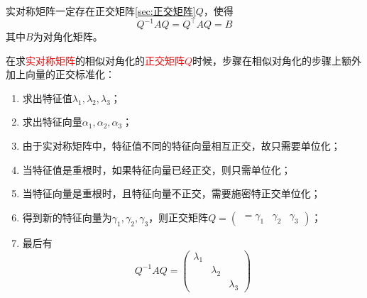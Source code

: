 \begin{theorem}
    实对称矩阵一定存在正交矩阵\ref{sec:正交矩阵}$Q$，使得
    \[ Q^{-1}AQ = Q^\intercal AQ = B \]
    其中$B$为对角化矩阵。
\end{theorem}
在求\textcolor{red}{实对称矩阵}的相似对角化的\textcolor{red}{正交矩阵$Q$}时候，步骤在相似对角化的步骤上额外加上向量的正交标准化：
\begin{enumerate}[(1)]
    \item 求出特征值$\lambda_1,\lambda_2,\lambda_3$；
    \item 求出特征向量$\alpha_1,\alpha_2,\alpha_3$；
    \item 由于实对称矩阵中，特征值不同的特征向量相互正交，故只需要单位化；
    \item 当特征值是重根时，如果特征向量已经正交，则只需单位化；
    \item 当特征向量是重根时，且特征向量不正交，需要施密特正交单位化；
    \item 得到新的特征向量为$\gamma_1,\gamma_2,\gamma_3$，则正交矩阵$Q=\begin{pmatrix}=\gamma_1 & \gamma_2 & \gamma_3\end{pmatrix}$；
    \item 最后有
          \[
              Q^{-1}AQ =
              \begin{pmatrix}
                  \lambda_1 &           &           \\
                            & \lambda_2 &           \\
                            &           & \lambda_3
              \end{pmatrix}
          \]
\end{enumerate}

